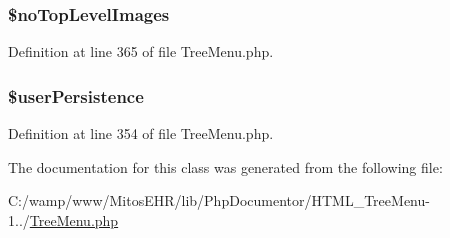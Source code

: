 \hypertarget{class_h_t_m_l___tree_menu___d_h_t_m_l_aecd84a357b47ff0561e12dc717702b5a}{
\subsubsection[{\$no\-Top\-Level\-Images}]{\setlength{\rightskip}{0pt plus 5cm}\$no\-Top\-Level\-Images}}\label{class_h_t_m_l___tree_menu___d_h_t_m_l_aecd84a357b47ff0561e12dc717702b5a}


\-Definition at line 365 of file \-Tree\-Menu.\-php.

\hypertarget{class_h_t_m_l___tree_menu___d_h_t_m_l_a376d9d3d2e06444fc17f372b3d5395dd}{
\subsubsection[{\$user\-Persistence}]{\setlength{\rightskip}{0pt plus 5cm}\$user\-Persistence}}\label{class_h_t_m_l___tree_menu___d_h_t_m_l_a376d9d3d2e06444fc17f372b3d5395dd}


\-Definition at line 354 of file \-Tree\-Menu.\-php.



\-The documentation for this class was generated from the following file\-:\begin{DoxyCompactItemize}
\item 
\-C\-:/wamp/www/\-Mitos\-E\-H\-R/lib/\-Php\-Documentor/\-H\-T\-M\-L\-\_\-\-Tree\-Menu-\/1../\hyperlink{_tree_menu_8php}{\-Tree\-Menu.\-php}\end{DoxyCompactItemize}
